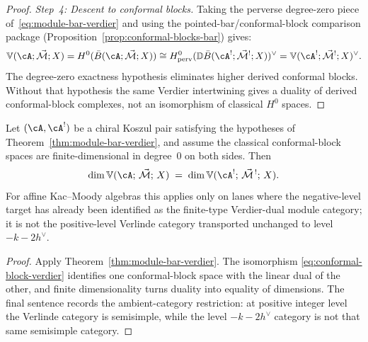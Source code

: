 \begin{proof}
\emph{Step~4: Descent to conformal blocks.}
Taking the perverse degree-zero piece of~\eqref{eq:module-bar-verdier}
and using the pointed-bar/conformal-block comparison package
(Proposition~\ref{prop:conformal-blocks-bar}) gives:
\[
\mathbb{V}(\cA; \vec{\mathcal{M}}; X)
= H^0(\bar{B}(\cA; \vec{\mathcal{M}}; X))
\cong H^0_{\mathrm{perv}}(\mathbb{D}\bar{B}(\cA^!; \vec{\mathcal{M}}^!; X))^\vee
= \mathbb{V}(\cA^!; \vec{\mathcal{M}}^!; X)^\vee.
\]
The degree-zero exactness hypothesis eliminates higher derived
conformal blocks. Without that hypothesis the same Verdier
intertwining gives a duality of derived conformal-block complexes,
not an isomorphism of classical $H^0$ spaces.
\end{proof}

\begin{corollary}
\label{cor:conformal-block-dim-invariance}
Let $(\cA,\cA^!)$ be a chiral Koszul pair satisfying the hypotheses
of Theorem~\textup{\ref{thm:module-bar-verdier}}, and assume the
classical conformal-block spaces are finite-dimensional in degree~$0$
on both sides. Then
\[
\dim\mathbb{V}(\cA;\, \vec{\mathcal M};\, X)
\;=\;
\dim\mathbb{V}(\cA^!;\,\vec{\mathcal M}^{\,!};\, X).
\]
For affine Kac--Moody algebras this applies only on lanes where the
negative-level target has already been identified as the finite-type
Verdier-dual module category; it is not the positive-level Verlinde
category transported unchanged to level $-k-2h^\vee$.
\end{corollary}

\begin{proof}
Apply Theorem~\ref{thm:module-bar-verdier}. The isomorphism
\eqref{eq:conformal-block-verdier} identifies one conformal-block
space with the linear dual of the other, and finite dimensionality
turns duality into equality of dimensions. The final sentence records
the ambient-category restriction: at positive integer level the
Verlinde category is semisimple, while the level
$-k-2h^\vee$ category is not that same semisimple category.
\end{proof}

